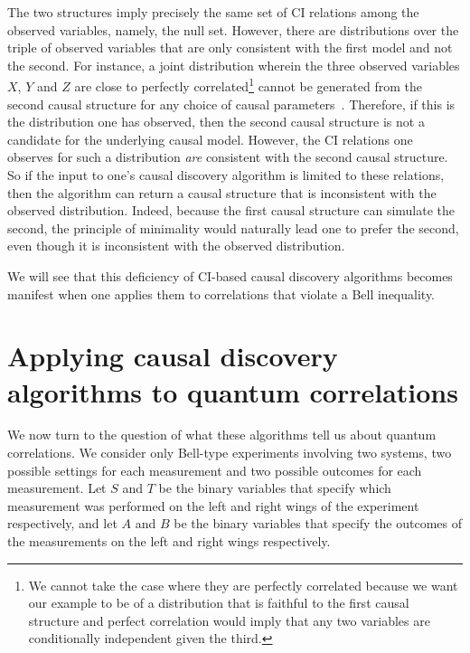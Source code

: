 \documentclass[12pt,onecolumn,nofootinbib]{revtex4-2}
\begin{document}
The two structures imply precisely the same set of CI relations among the observed variables, namely, the null set.
However, there are distributions over the triple of observed variables that are only consistent with the first model and not the second.  For instance, a joint distribution wherein the three observed variables $X$, $Y$ and $Z$ are close to perfectly correlated\footnote{We cannot take the case where they are perfectly correlated because we want our example to be of a distribution that is faithful to the first causal structure and perfect correlation would imply that any two variables are conditionally independent given the third.} cannot be generated from the second causal structure for any choice of causal parameters~\cite{SteudelAy,Fritz2012}.  Therefore, if this is the distribution one has observed, then the second causal structure is not a candidate for the underlying causal model.  However, the CI relations one observes for such a distribution \emph{are} consistent with the second causal structure.  
So if the input to one's causal discovery algorithm is limited to these relations, then the algorithm can return a causal structure that is inconsistent with the observed distribution. Indeed, because the first causal structure can simulate the second, the principle of minimality would naturally lead one to prefer the second, even though it is inconsistent with the observed distribution. 

We will see that this deficiency of CI-based causal discovery algorithms becomes manifest when one applies them to correlations that violate a Bell inequality.

\section{Applying causal discovery algorithms to quantum correlations}
\label{sec:qcor}

We now turn to the question of what these algorithms tell us about quantum correlations.
We consider only Bell-type experiments involving two systems, two possible settings for each measurement and two possible outcomes for each measurement.
Let $S$ and $T$ be the binary variables that specify which measurement was
performed on the left and right wings of the experiment respectively, and
let $A$ and $B$ be the binary variables that specify the outcomes of the
measurements on the left and right wings respectively.
\end{document}
